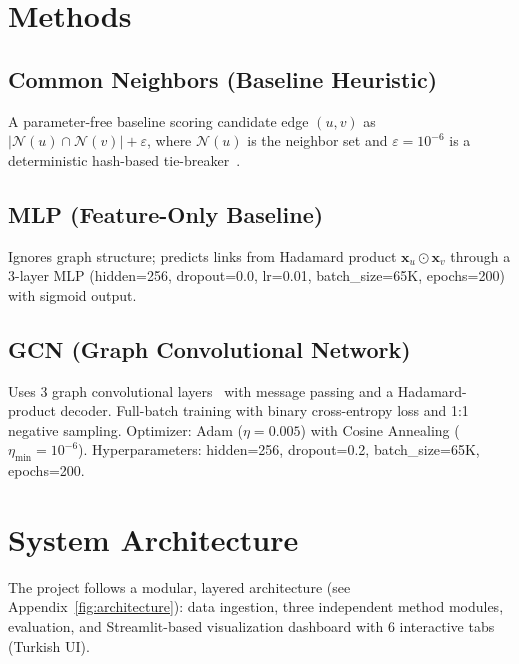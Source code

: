 \documentclass[12pt,a4paper]{article}
\begin{document}
\section{Methods}

\subsection{Common Neighbors (Baseline Heuristic)}

A parameter-free baseline scoring candidate edge $(u,v)$ as $|\mathcal{N}(u) \cap \mathcal{N}(v)| + \varepsilon$, where $\mathcal{N}(u)$ is the neighbor set and $\varepsilon = 10^{-6}$ is a deterministic hash-based tie-breaker~\cite{newman2001}.

\subsection{MLP (Feature-Only Baseline)}

Ignores graph structure; predicts links from Hadamard product $\mathbf{x}_u \odot \mathbf{x}_v$ through a 3-layer MLP (hidden=256, dropout=0.0, lr=0.01, batch\_size=65K, epochs=200) with sigmoid output.

\subsection{GCN (Graph Convolutional Network)}

Uses 3 graph convolutional layers~\cite{kipf2017} with message passing and a Hadamard-product decoder. Full-batch training with binary cross-entropy loss and 1:1 negative sampling. Optimizer: Adam ($\eta=0.005$) with Cosine Annealing ($\eta_{\min}=10^{-6}$). Hyperparameters: hidden=256, dropout=0.2, batch\_size=65K, epochs=200.

\section{System Architecture}

The project follows a modular, layered architecture (see Appendix~\ref{fig:architecture}): data ingestion, three independent method modules, evaluation, and Streamlit-based visualization dashboard with 6 interactive tabs (Turkish UI).
\end{document}
